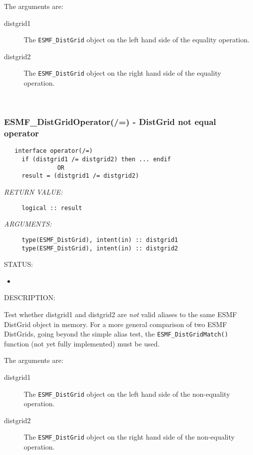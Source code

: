      The arguments are:
     \begin{description}
     \item[distgrid1]
       The {\tt ESMF\_DistGrid} object on the left hand side of the equality
       operation.
     \item[distgrid2]
       The {\tt ESMF\_DistGrid} object on the right hand side of the equality
       operation.
     \end{description}
   
 
\mbox{}\hrulefill\ 
 
\subsubsection [ESMF\_DistGridOperator(/=)] {ESMF\_DistGridOperator(/=) - DistGrid not equal operator}


  
\begin{verbatim}   interface operator(/=)
     if (distgrid1 /= distgrid2) then ... endif
               OR
     result = (distgrid1 /= distgrid2)\end{verbatim}{\em RETURN VALUE:}
\begin{verbatim}     logical :: result\end{verbatim}{\em ARGUMENTS:}
\begin{verbatim}     type(ESMF_DistGrid), intent(in) :: distgrid1
     type(ESMF_DistGrid), intent(in) :: distgrid2\end{verbatim}
{\sf STATUS:}
   \begin{itemize}
   \item{}
   \end{itemize}
  
{\sf DESCRIPTION:\\ }


     Test whether distgrid1 and distgrid2 are {\it not} valid aliases to the
     same ESMF DistGrid object in memory. For a more general comparison of two
     ESMF DistGrids, going beyond the simple alias test, the
     {\tt ESMF\_DistGridMatch()} function (not yet fully implemented) must 
     be used.
  
     The arguments are:
     \begin{description}
     \item[distgrid1]
       The {\tt ESMF\_DistGrid} object on the left hand side of the non-equality
       operation.
     \item[distgrid2]
       The {\tt ESMF\_DistGrid} object on the right hand side of the non-equality
       operation.
     \end{description}
   
